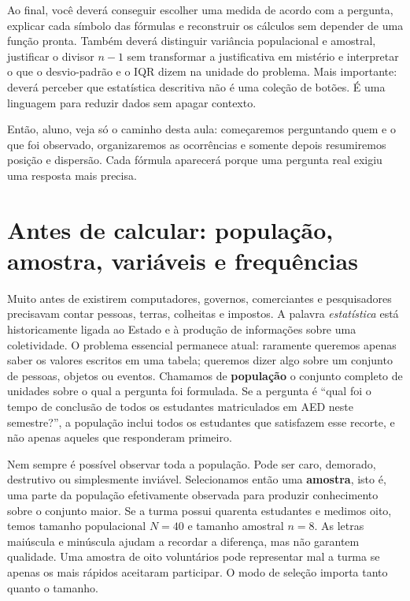 Ao final, você deverá conseguir escolher uma medida de acordo com a pergunta, explicar cada símbolo das fórmulas e reconstruir os cálculos sem depender de uma função pronta. Também deverá distinguir variância populacional e amostral, justificar o divisor $n-1$ sem transformar a justificativa em mistério e interpretar o que o desvio-padrão e o IQR dizem na unidade do problema. Mais importante: deverá perceber que estatística descritiva não é uma coleção de botões. É uma linguagem para reduzir dados sem apagar contexto.

\begin{SummaryBox}
Então, aluno, veja só o caminho desta aula: começaremos perguntando quem e o que foi observado, organizaremos as ocorrências e somente depois resumiremos posição e dispersão. Cada fórmula aparecerá porque uma pergunta real exigiu uma resposta mais precisa.
\end{SummaryBox}

\section{Antes de calcular: população, amostra, variáveis e frequências}

Muito antes de existirem computadores, governos, comerciantes e pesquisadores precisavam contar pessoas, terras, colheitas e impostos. A palavra \textit{estatística} está historicamente ligada ao Estado e à produção de informações sobre uma coletividade. O problema essencial permanece atual: raramente queremos apenas saber os valores escritos em uma tabela; queremos dizer algo sobre um conjunto de pessoas, objetos ou eventos. Chamamos de \textbf{população} o conjunto completo de unidades sobre o qual a pergunta foi formulada. Se a pergunta é ``qual foi o tempo de conclusão de todos os estudantes matriculados em AED neste semestre?'', a população inclui todos os estudantes que satisfazem esse recorte, e não apenas aqueles que responderam primeiro.

Nem sempre é possível observar toda a população. Pode ser caro, demorado, destrutivo ou simplesmente inviável. Selecionamos então uma \textbf{amostra}, isto é, uma parte da população efetivamente observada para produzir conhecimento sobre o conjunto maior. Se a turma possui quarenta estudantes e medimos oito, temos tamanho populacional $N=40$ e tamanho amostral $n=8$. As letras maiúscula e minúscula ajudam a recordar a diferença, mas não garantem qualidade. Uma amostra de oito voluntários pode representar mal a turma se apenas os mais rápidos aceitaram participar. O modo de seleção importa tanto quanto o tamanho.

